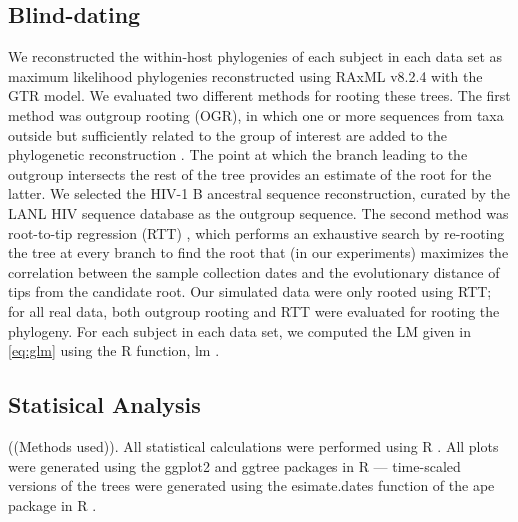 \documentclass[9pt,twocolumn,twoside,lineno]{pnas-new}
\begin{document}
{\subsection*{Blind-dating}
We reconstructed the within-host phylogenies of each subject in each data set as maximum likelihood phylogenies reconstructed using RAxML v8.2.4 \cite{raxml} with the GTR model.
We evaluated two different methods for rooting these trees. 
The first method was outgroup rooting (OGR), in which one or more sequences from taxa outside but sufficiently related to the group of interest are added to the phylogenetic reconstruction \cite{Huelsenbeck02}.
The point at which the branch leading to the outgroup intersects the rest of the tree provides an estimate of the root for the latter.
We selected the HIV-1 B ancestral sequence reconstruction,  curated by the LANL HIV sequence database as the outgroup sequence.
The second method was root-to-tip regression (RTT) \cite{Korber00}, which performs an exhaustive search by re-rooting the tree at every branch to find the root that (in our experiments) maximizes the correlation between the sample collection dates and the evolutionary distance of tips from the candidate root.
Our simulated data were only rooted using RTT; for all real data, both outgroup rooting and RTT were evaluated for rooting the phylogeny.
For each subject in each data set, we computed the LM given in \cref{eq:glm} using the R function, lm \cite{rscript}.
\subsection*{Statisical Analysis}
((Methods used)).
All statistical calculations were performed using R \cite{rscript}.
All plots were generated using the ggplot2 and ggtree packages in R \cite{ggplot,ggtree} --- time-scaled versions of the trees were generated using the esimate.dates function of the ape package in R \cite{ape,nodedating}.
}

\showmatmethods{} %



\pnasbreak{}


\end{document}
